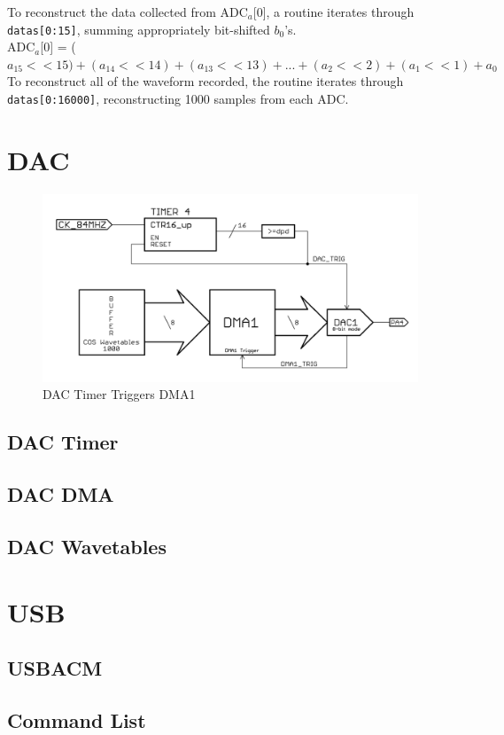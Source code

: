\documentclass[11pt,twoside]{mitthesis}
\begin{document}
To reconstruct the data collected from ADC$_a$[0], a routine iterates through \texttt{datas[0:15]}, summing appropriately bit-shifted $b_0$'s.\\
ADC$_a$[0] = ($a_{15}<<15)+(a_{14}<<14)+(a_{13}<<13)+...+(a_{2}<<2)+(a_{1}<<1)+a_0$\\
To reconstruct all of the waveform recorded, the routine iterates through \texttt{datas[0:16000]}, reconstructing 1000 samples from each ADC.

\section{DAC}



\begin{figure}[H]
  \begin{center}
      \includegraphics[width=1\textwidth]{../DAC-DMA.png}
      \caption{DAC Timer Triggers DMA1}
  \end{center}
\end{figure}

\subsection{DAC Timer}

\subsection{DAC DMA}

\subsection{DAC Wavetables}

\section{USB}
\subsection{USBACM}
\subsection{Command List}
\end{document}
